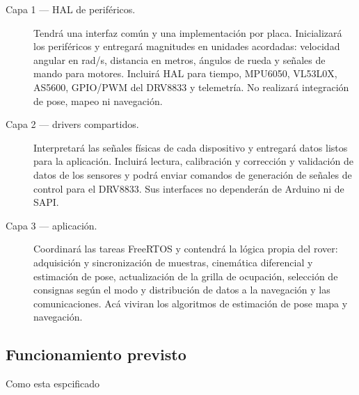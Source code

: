 \documentclass[11pt,a4paper]{article}
\begin{document}
\begin{description}
  \item[Capa 1 --- HAL de periféricos.] Tendrá una interfaz común y una
        implementación por placa. Inicializará los periféricos y entregará
        magnitudes en unidades acordadas: velocidad angular en rad/s,
        distancia en metros, ángulos de rueda y señales de mando para motores.
        Incluirá HAL para tiempo, MPU6050, VL53L0X, AS5600, GPIO/PWM del DRV8833
        y telemetría. No realizará integración de pose, mapeo ni navegación.
  \item[Capa 2 --- drivers compartidos.] Interpretará las señales físicas de
        cada dispositivo y entregará datos listos para la aplicación. Incluirá lectura, calibración y corrección y validación de datos de los sensores y podrá enviar comandos de generación de señales de
        control para el DRV8833. Sus interfaces no dependerán de Arduino ni de
        SAPI.
  \item[Capa 3 --- aplicación.] Coordinará las tareas FreeRTOS y contendrá la
        lógica propia del rover: adquisición y sincronización de muestras,
        cinemática diferencial y estimación de pose, actualización de la grilla
        de ocupación, selección de consignas según el modo y distribución de
        datos a la navegación y las comunicaciones. Acá viviran los algoritmos de estimación de pose mapa y navegación. 
\end{description}

\subsection{Funcionamiento previsto}
Como esta espcificado 
\end{document}
